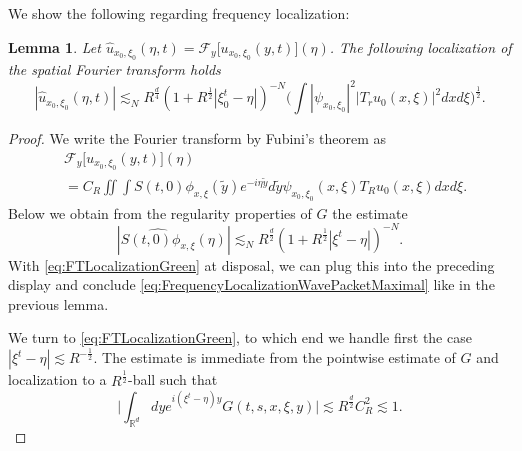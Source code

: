 \documentclass{amsart}
\newtheorem{lemma}[theorem]{Lemma}
\theoremstyle{definition}
\newcommand{\R}{\mathbb{R}}
\begin{document}
We show the following regarding frequency localization:
\begin{lemma}
Let $\hat{u}_{x_0,\xi_0}(\eta,t) = \mathcal{F}_y \big[ u_{x_0,\xi_0}(y,t) \big](\eta )$. The following localization of the spatial Fourier transform holds
\begin{equation}
\label{eq:FrequencyLocalizationWavePacketMaximal}
|\hat{u}_{x_0,\xi_0}(\eta,t)| \lesssim_N R^{\frac{d}{4}} (1 + R^{\frac{1}{2}} | \xi_0^t - \eta |)^{-N} \big( \int |\psi_{x_0,\xi_0}|^2 |T_r u_0(x,\xi)|^2 dx d\xi \big)^{\frac{1}{2}}.
\end{equation}
\end{lemma}
\begin{proof}
We write the Fourier transform by Fubini's theorem as
\begin{equation*}
\begin{split}
&\mathcal{F}_y \big[ u_{x_0,\xi_0}(y,t) \big](\eta ) \\
&= C_R \iint \int S(t,0) \phi_{x,\xi}(\tilde{y}) e^{-i \eta \tilde{y}} d\tilde{y} \psi_{x_0,\xi_0}(x,\xi) T_R u_0(x,\xi)  dx d\xi.
\end{split}
\end{equation*}
Below we obtain from the regularity properties of $G$ the estimate
\begin{equation}
\label{eq:FTLocalizationGreen}
    |\widehat{S(t,0) \phi_{x,\xi}}(\eta)| \lesssim_N R^{\frac{d}{2}} (1+ R^{\frac{1}{2}} |\xi^t - \eta|)^{-N}.
\end{equation}
With \eqref{eq:FTLocalizationGreen} at disposal, we can plug this into the preceding display and conclude \eqref{eq:FrequencyLocalizationWavePacketMaximal} like in the previous lemma.

We turn to \eqref{eq:FTLocalizationGreen}, to which end we handle first the case $|\xi^t - \eta | \lesssim R^{-\frac{1}{2}}$.
The estimate is immediate from the pointwise estimate of $G$ and localization to a $R^{\frac{1}{2}}$-ball such that
\begin{equation}
\label{eq:FTCoherentStateI}
\big| \int_{\R^d} dy e^{i ( \xi^t - \eta) y} G(t,s,x,\xi,y) \big| \lesssim R^{\frac{d}{2}} C_R^2 \lesssim 1.
\end{equation}


\end{proof}
\end{document}
